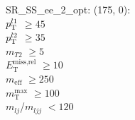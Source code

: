 SR\_SS\_ee\_2\_opt: (175, 0): \\
$p_{\text{T}}^{l1}$ $\geq 45$ \\
$p_{\text{T}}^{l2}$ $\geq 35$ \\
$m_{T2}$ $\geq 5$ \\
$E_{\text{T}}^{\text{miss,rel}}$ $\geq 10$ \\
$m_{\text{eff}}$ $\geq 250$ \\
$m_{\text{T}}^{\text{max}}$ $\geq 100$ \\
$m_{lj}$/$m_{ljj}$ $<120$ \\
